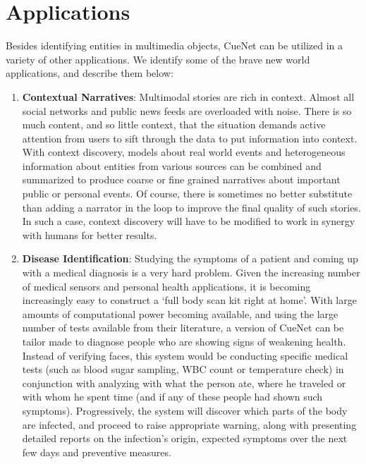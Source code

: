 \section{Applications}
Besides identifying entities in multimedia objects, CueNet can be utilized in a variety of other applications. We identify some of the brave new world applications, and describe them below:

\begin{enumerate}
  \item \textbf{Contextual Narratives}: Multimodal stories are rich in context. Almost all social networks and public news feeds are overloaded with noise. There is so much content, and so little context, that the situation demands active attention from users to sift through the data to put information into context. With context discovery, models about real world events and heterogeneous information about entities from various sources can be combined and summarized to produce coarse or fine grained narratives about important public or personal events. Of course, there is sometimes no better substitute than adding a narrator in the loop to improve the final quality of such stories. In such a case, context discovery will have to be modified to work in synergy with humans for better results.

  \item \textbf{Disease Identification}: Studying the symptoms of a patient and coming up with a medical diagnosis is a very hard problem. Given the increasing number of medical sensors and personal health applications, it is becoming increasingly easy to construct a `full body scan kit right at home'. With large amounts of computational power becoming available, and using the large number of tests available from their literature, a version of CueNet can be tailor made to diagnose people who are showing signs of weakening health. Instead of verifying faces, this system would be conducting specific medical tests (such as blood sugar sampling, WBC count or temperature check) in conjunction with analyzing with what the person ate, where he traveled or with whom he spent time (and if any of these people had shown such symptoms). Progressively, the system will discover which parts of the body are infected, and proceed to raise appropriate warning, along with presenting detailed reports on the infection's origin, expected symptoms over the next few days and preventive measures.


\end{enumerate}
